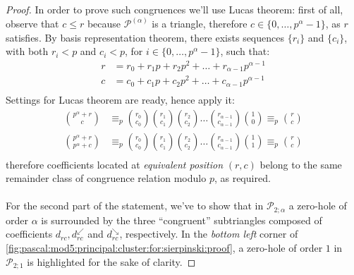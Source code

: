 \begin{proof}
  In order to prove such congruences we'll use Lucas theorem:
  first of all, observe that $c \leq r$ because $\mathcal{P}^{(\alpha)}$ 
  is a triangle, therefore $c \in \lbrace 0, \ldots, p^{\alpha} -1 \rbrace$,
  as $r$ satisfies.  By basis representation theorem, there exists
  sequences $\lbrace r_i\rbrace$ and $\lbrace c_i\rbrace$, 
  with both $r_i< p$ and $c_i < p$, for $i \in \lbrace 0, \ldots, p^{\alpha} -1 \rbrace$,
  such that:
  \begin{displaymath}
    \begin{split}
      r &= r_0 + r_1 p + r_2 p^2 + \ldots + r_{{\alpha}-1}p^{{\alpha}-1} \\
      c &= c_0 + c_1 p + c_2 p^2 + \ldots + c_{{\alpha}-1}p^{{\alpha}-1} \\
    \end{split}
  \end{displaymath}
  Settings for Lucas theorem are ready, hence apply it:
  \begin{displaymath}
    \begin{split}
      {{p^{\alpha}+r} \choose {c}} &\equiv_{p} {{r_0} \choose {c_0}} {{r_1} \choose {c_1}}{{r_2} \choose {c_2}} \ldots 
      {{r_{{\alpha}-1}} \choose {c_{{\alpha}-1}}}{{1} \choose {0}} \equiv_{p} {{r} \choose {c}}\\
      {{p^{\alpha}+r} \choose {p^{\alpha}+c}} &\equiv_{p} {{r_0} \choose {c_0}} {{r_1} \choose {c_1}}{{r_2} \choose {c_2}} \ldots 
      {{r_{{\alpha}-1}} \choose {c_{{\alpha}-1}}}{{1} \choose {1}} \equiv_{p} {{r} \choose {c}}\\
    \end{split}
  \end{displaymath}
  therefore coefficients located at \emph{equivalent position} 
  $(r,c)$ belong to the same remainder class of congruence relation
  modulo $p$, as required.
  \\\\

  For the second part  of the statement, we've to show that in
  $\mathcal{P}_{2;\alpha}$ a zero-hole of order $\alpha$ is
  surrounded by the three ``congruent'' subtriangles composed of
  coefficients $d_{rc}, d_{rc}^{\swarrow}$ and $d_{rc}^{\searrow} $, respectively.
  In the \emph{bottom left} corner of \autoref{fig:pascal:mod5:principal:cluster:for:sierpinski:proof},
  a zero-hole of order $1$ in $\mathcal{P}_{2;1}$ is highlighted for the sake of clarity.


\end{proof}
